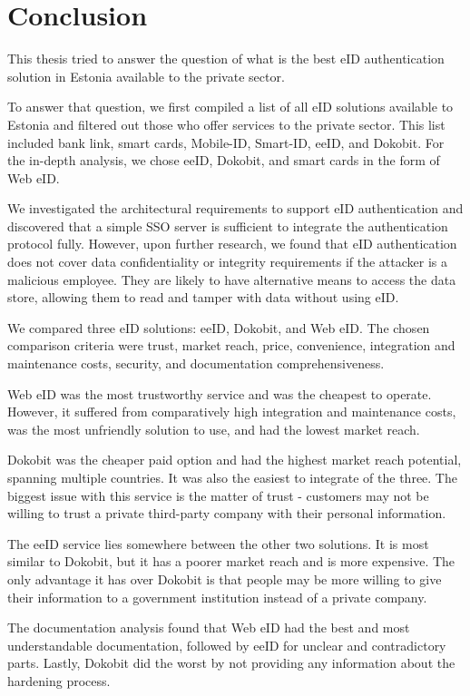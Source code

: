 \section{Conclusion}

This thesis tried to answer the question of what is the best eID authentication solution in Estonia available to the private sector.

To answer that question, we first compiled a list of all eID solutions available to Estonia and filtered out those who offer services to the private sector. This list included {bank link}, smart cards, Mobile-ID, Smart-ID, eeID, and Dokobit. For the in-depth analysis, we chose eeID, Dokobit, and smart cards in the form of Web eID.

We investigated the architectural requirements to support eID authentication and discovered that a simple SSO server is sufficient to integrate the authentication protocol fully. However, upon further research, we found that eID authentication does not cover data confidentiality or integrity requirements if the attacker is a malicious employee. They are likely to have alternative means to access the data store, allowing them to read and tamper with data without using eID.

We compared three eID solutions: eeID, Dokobit, and Web eID. The chosen comparison criteria were trust, market reach, price, convenience, integration and maintenance costs, security, and documentation comprehensiveness.

Web eID was the most trustworthy service and was the cheapest to operate. However, it suffered from comparatively high integration and maintenance costs, was the most unfriendly solution to use, and had the lowest market reach.

Dokobit was the cheaper paid option and had the highest market reach potential, spanning multiple countries. It was also the easiest to integrate of the three. The biggest issue with this service is the matter of trust - customers may not be willing to trust a private third-party company with their personal information.

The eeID service lies somewhere between the other two solutions. It is most similar to Dokobit, but it has a poorer market reach and is more expensive. The only advantage it has over Dokobit is that people may be more willing to give their information to a government institution instead of a private company.

The documentation analysis found that Web eID had the best and most understandable documentation, followed by eeID for unclear and contradictory parts. Lastly, Dokobit did the worst by not providing any information about the hardening process.

